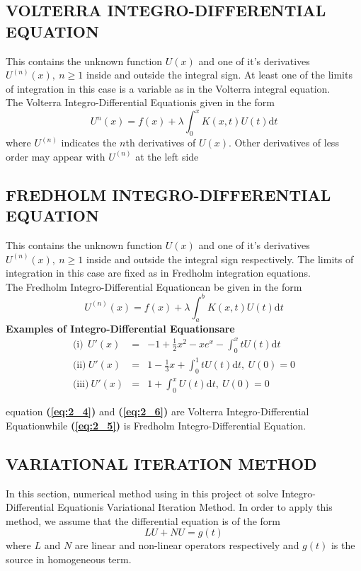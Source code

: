 \documentclass[12pt]{report}
\newcommand{\bt}[1]{\textbf{#1}}
\newcommand{\refn}[1]{\textbf{(\ref{#1})}}
\newcommand{\NI}{\noindent}
\newcommand{\IDE}{Integro-Differential Equation}
\newcommand{\IDEs}{Integro-Differential Equations}
\newcommand{\Unx}{U^{(n)}(x)}
\newcommand{\Uxprime}{U'(x)}
\begin{document}
	\subsection{VOLTERRA INTEGRO-DIFFERENTIAL EQUATION}
	This contains the unknown function $U(x)$ and one of it's derivatives $U^{(n)}(x), ~ n \geq 1$ inside and outside the integral sign. At least one of the limits of integration in this case is a variable as in the Volterra integral equation.\\
	
	\NI The Volterra \IDE is given in the form 
	\begin{equation}
		U^{n}(x) = f(x) + \lambda \int_{0}^{x}K(x,t)U(t)\text{d}t
	\end{equation}
	where $U^{(n)}$ indicates the $n$th derivatives of $U(x)$. Other derivatives of less order may appear with $U^{(n)}$ at the left side 
	
	\subsection{FREDHOLM INTEGRO-DIFFERENTIAL EQUATION}
	This contains the unknown function $U(x)$ and one of it's derivatives $U^{(n)}(x), ~ n \geq 1$ inside and outside  the integral sign respectively. The limits of integration in this case are fixed as in Fredholm integration equations.\\
	
	\NI The Fredholm \IDE can be given in the form
	\begin{equation}
		\Unx = f(x) + \lambda \int_{a}^{b} K(x,t)U(t) \text{d}t
	\end{equation}
	\bt{Examples of \IDEs are}
	\begin{eqnarray}
		\text{(i)}~~ \Uxprime &=& -1 + \frac{1}{2} x^2 - xe^x - \int_{0}^{x} tU(t)\text{d}t \label{eq:2_4}\\
		\text{(ii)}~  \Uxprime &=& 1 - \frac{1}{3}x + \int_{0}^{1} tU(t)\text{d}t, ~ U(0)=0 \label{eq:2_5}\\
		\text{(iii)}~ \Uxprime &=& 1 + \int_{0}^{x}U(t)\text{d}t, ~ U(0)=0 \label{eq:2_6}
	\end{eqnarray}
	
	\NI equation \refn{eq:2_4} and \refn{eq:2_6} are Volterra \IDE while \refn{eq:2_5} is Fredholm \IDE.
	
	\subsection{VARIATIONAL ITERATION METHOD}
	In this section, numerical method using in this project ot solve \IDE is Variational Iteration Method. In order to apply this method, we assume that the differential equation is of the form 
	\begin{equation}
		LU + NU = g(t) \label{eq:2_7}
	\end{equation}
	where $L$ and $N$ are linear and non-linear operators respectively and $g(t)$ is the source in homogeneous term.\\
	
\end{document}
